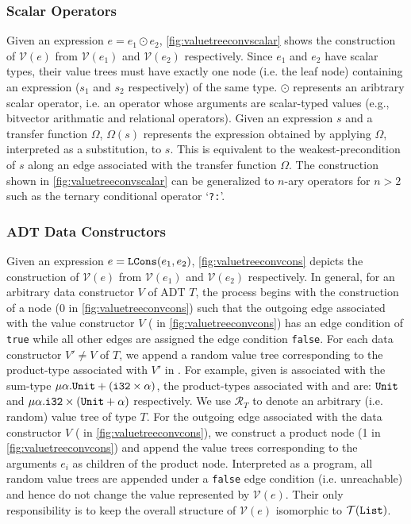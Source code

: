 \subsubsection{Scalar Operators}
Given an expression $e = e_1 \odot e_2$,
\cref{fig:valuetreeconvscalar} shows the construction of $\mathcal{V}(e)$
from $\mathcal{V}(e_1)$ and $\mathcal{V}(e_2)$ respectively.
Since $e_1$ and $e_2$ have scalar types, their value trees must have exactly one
node (i.e. the leaf node) containing an expression ($s_1$ and $s_2$ respectively) of the same type.
$\odot$ represents an aribtrary scalar operator, i.e. an operator whose arguments
are scalar-typed values (e.g., bitvector arithmatic and relational operators).
Given an expression $s$ and a transfer function $\Omega$, $\Omega(s)$
represents the expression obtained by applying $\Omega$, interpreted as a substitution,
to $s$. This is equivalent to the weakest-precondition of $s$ along an edge associated
with the transfer function $\Omega$.
The construction shown in \cref{fig:valuetreeconvscalar} can be generalized to
$n$-ary operators for $n>2$ such as the ternary conditional operator `{\tt ?:}'.

\subsubsection{ADT Data Constructors}
Given an expression $e = {\tt LCons}(e_1, e_2)$,
\cref{fig:valuetreeconvcons} depicts the construction of $\mathcal{V}(e)$
from $\mathcal{V}(e_1)$ and $\mathcal{V}(e_2)$ respectively.
In general, for an arbitrary data constructor $V$ of ADT $T$,
the process begins with the construction of a \sumn{} node (0 in \cref{fig:valuetreeconvcons})
such that the outgoing edge associated with the value constructor $V$ ( in \cref{fig:valuetreeconvcons})
has an edge condition of {\tt true} while all other edges are assigned the edge condition {\tt false}.
For each data constructor $V' \neq V$ of $T$, we append a random value tree corresponding to the product-type
associated with $V'$ in \typegrammar{}.
For example, given  is associated with the sum-type $\mu \alpha. {\tt Unit} + ({\tt i32} \times \alpha)$,
the product-types associated with  and  are:
${\tt Unit}$ and $\mu \alpha. {\tt i32} \times ({\tt Unit} + \alpha)$ respectively.
We use $\mathcal{R}_T$ to denote an arbitrary (i.e. random) value tree of type $T$.
For the outgoing edge associated with the data constructor $V$ ( in \cref{fig:valuetreeconvcons}),
we construct a product node (1 in \cref{fig:valuetreeconvcons}) and append the
value trees corresponding to the arguments $e_i$ as children of the product node.
Interpreted as a program, all random value trees are appended under a {\tt false} edge condition
(i.e. unreachable) and hence do not change the value represented by $\mathcal{V}(e)$.
Their only responsibility is to keep the overall structure of $\mathcal{V}(e)$ isomorphic to $\mathcal{T}({\tt List})$.

